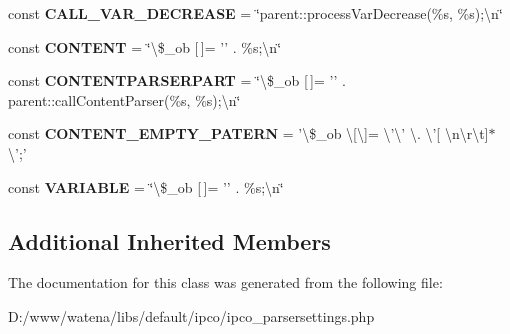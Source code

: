 \begin{DoxyCompactItemize}
\item 
\hypertarget{class_i_p_c_o___parser_settings_a42d3dcbbea67cc1e849a9a36bb36ed8e}{const {\bfseries C\-A\-L\-L\-\_\-\-V\-A\-R\-\_\-\-D\-E\-C\-R\-E\-A\-S\-E} = \char`\"{}parent\-::process\-Var\-Decrease(\%s, \%s);\textbackslash{}n\char`\"{}}\label{class_i_p_c_o___parser_settings_a42d3dcbbea67cc1e849a9a36bb36ed8e}

\item 
\hypertarget{class_i_p_c_o___parser_settings_ac9f948390aff1cdfc194a4bc393f7356}{const {\bfseries C\-O\-N\-T\-E\-N\-T} = \char`\"{}\textbackslash{}\$\-\_\-ob \mbox{[}$\,$\mbox{]}= '' . \%s;\textbackslash{}n\char`\"{}}\label{class_i_p_c_o___parser_settings_ac9f948390aff1cdfc194a4bc393f7356}

\item 
\hypertarget{class_i_p_c_o___parser_settings_acc79201aef4e1bc7ccdc11edab5c000a}{const {\bfseries C\-O\-N\-T\-E\-N\-T\-P\-A\-R\-S\-E\-R\-P\-A\-R\-T} = \char`\"{}\textbackslash{}\$\-\_\-ob \mbox{[}$\,$\mbox{]}= '' . parent\-::call\-Content\-Parser(\%s, \%s);\textbackslash{}n\char`\"{}}\label{class_i_p_c_o___parser_settings_acc79201aef4e1bc7ccdc11edab5c000a}

\item 
\hypertarget{class_i_p_c_o___parser_settings_aeb0048ec1b402d57d461bb283b074ec7}{const {\bfseries C\-O\-N\-T\-E\-N\-T\-\_\-\-E\-M\-P\-T\-Y\-\_\-\-P\-A\-T\-E\-R\-N} = '\textbackslash{}\$\-\_\-ob \textbackslash{}\mbox{[}\textbackslash{}\mbox{]}= \textbackslash{}'\textbackslash{}' \textbackslash{}. \textbackslash{}'\mbox{[} \textbackslash{}n\textbackslash{}r\textbackslash{}t\mbox{]}$\ast$\textbackslash{}';'}\label{class_i_p_c_o___parser_settings_aeb0048ec1b402d57d461bb283b074ec7}

\item 
\hypertarget{class_i_p_c_o___parser_settings_ae3593347936ab795b25ba0c9e03d68c7}{const {\bfseries V\-A\-R\-I\-A\-B\-L\-E} = \char`\"{}\textbackslash{}\$\-\_\-ob \mbox{[}$\,$\mbox{]}= '' . \%s;\textbackslash{}n\char`\"{}}\label{class_i_p_c_o___parser_settings_ae3593347936ab795b25ba0c9e03d68c7}

\end{DoxyCompactItemize}
\subsection*{Additional Inherited Members}


The documentation for this class was generated from the following file\-:\begin{DoxyCompactItemize}
\item 
D\-:/www/watena/libs/default/ipco/ipco\-\_\-parsersettings.\-php\end{DoxyCompactItemize}
